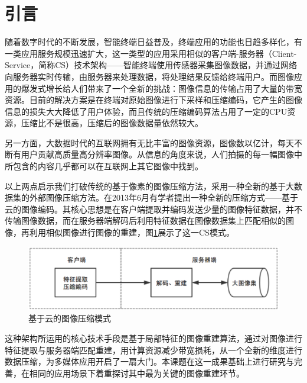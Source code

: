 \documentclass[UTF8]{csoarticle}
\begin{document}
\maketitle



\section{引言}

随着数字时代的不断发展，智能终端日益普及，终端应用的功能也日趋多样化，有一类应用服务规模迅速扩大，这一类型的应用采用相似的客户端-服务器（Client-Service，简称CS）技术架构——智能终端使用传感器采集图像数据，并通过网络向服务器实时传输，由服务器来处理数据，将处理结果反馈给终端用户。而图像应用的爆发式增长给人们带来了一个全新的挑战：图像信息的传输占用了大量的带宽资源。目前的解决方案是在终端对原始图像进行下采样和压缩编码，它产生的图像信息的损失大大降低了用户体验，而且传统的压缩编码算法占用了一定的CPU资源，压缩比不是很高，压缩后的图像数据量依然较大。

另一方面，大数据时代的互联网拥有无比丰富的图像资源，图像数以亿计，每天不断有用户贡献高质量高分辨率图像。从信息的角度来说，人们拍摄的每一幅图像中所包含的内容几乎都可以在互联网上其它图像中找到。

以上两点启示我们打破传统的基于像素的图像压缩方法，采用一种全新的基于大数据集的外部图像压缩方法。在2013年6月有学者提出一种全新的压缩方式——基于云的图像编码。其核心思想是在客户端提取并编码发送少量的图像特征数据，并不传输图像数据，而在服务器端解码后利用特征数据在图像数据集上匹配相似的图像，再利用相似图像进行图像的重建，图\ref{fig:overview}展示了这一CS模式。
\begin{figure}
\centering\includegraphics[width=12cm]{overview}
\caption{基于云的图像压缩模式}
\label{fig:overview}
\end{figure}
这种架构所运用的核心技术手段是基于局部特征的图像重建算法，通过对图像进行特征提取与服务器端匹配重建，用计算资源减少带宽损耗，从一个全新的维度进行数据压缩，为多媒体应用开启了一扇大门。本课题在这一成果基础上进行研究与完善，在相同的应用场景下着重探讨其中最为关键的图像重建环节。
\end{document}
